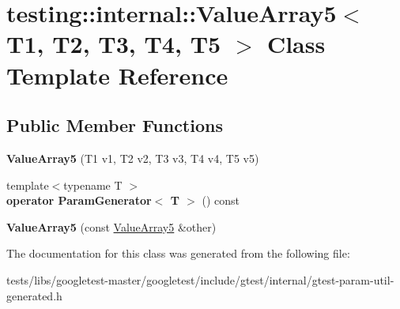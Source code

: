 \hypertarget{classtesting_1_1internal_1_1ValueArray5}{}\section{testing\+:\+:internal\+:\+:Value\+Array5$<$ T1, T2, T3, T4, T5 $>$ Class Template Reference}
\label{classtesting_1_1internal_1_1ValueArray5}
\subsection*{Public Member Functions}
\begin{DoxyCompactItemize}
\item 
\mbox{\label{classtesting_1_1internal_1_1ValueArray5_a9c5687fd18da21263aebc21b9ea508b8}} 
{\bfseries Value\+Array5} (T1 v1, T2 v2, T3 v3, T4 v4, T5 v5)
\item 
\mbox{\label{classtesting_1_1internal_1_1ValueArray5_ab925a168d89be9964c4319e5212222c1}} 
{\footnotesize template$<$typename T $>$ }\\{\bfseries operator Param\+Generator$<$ T $>$} () const
\item 
\mbox{\label{classtesting_1_1internal_1_1ValueArray5_a7de67e844073d0ec3c7c6e5736fb9ba6}} 
{\bfseries Value\+Array5} (const \hyperlink{classtesting_1_1internal_1_1ValueArray5}{Value\+Array5} \&other)
\end{DoxyCompactItemize}


The documentation for this class was generated from the following file\+:\begin{DoxyCompactItemize}
\item 
tests/libs/googletest-\/master/googletest/include/gtest/internal/gtest-\/param-\/util-\/generated.\+h\end{DoxyCompactItemize}
